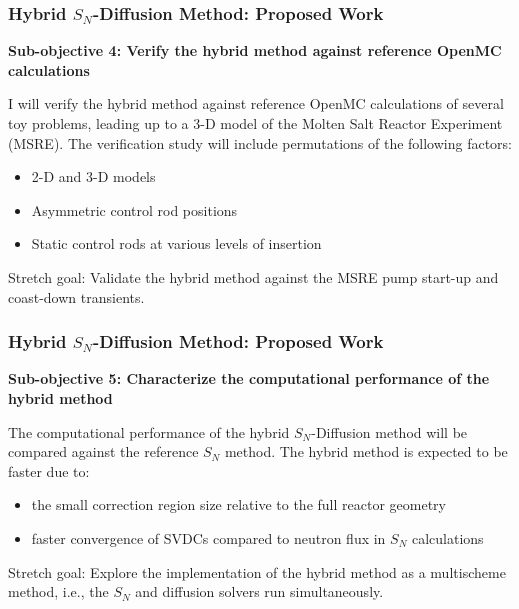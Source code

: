\begin{frame}
  \frametitle{Hybrid $S_N$-Diffusion Method: Proposed Work}
  \textbf{Sub-objective 4: Verify the hybrid method against reference OpenMC calculations}
  \vspace{.3cm}

  I will verify the hybrid method against reference OpenMC calculations of several toy problems,
  leading up to a 3-D model of the Molten Salt Reactor Experiment (MSRE). The verification study
  will include permutations of the following factors:
  \begin{itemize}
    \item 2-D and 3-D models
    \item Asymmetric control rod positions
    \item Static control rods at various levels of insertion
  \end{itemize}
  Stretch goal: Validate the hybrid method against the MSRE pump start-up and coast-down
  transients.
\end{frame}

\begin{frame}
  \frametitle{Hybrid $S_N$-Diffusion Method: Proposed Work}
  \textbf{Sub-objective 5: Characterize the computational performance of the hybrid method}
  \vspace{.3cm}

  The computational performance of the hybrid $S_N$-Diffusion method will be compared against the
  reference $S_N$ method. The hybrid method is expected to be faster due to:
  \begin{itemize}
    \item the small correction region size relative to the full reactor geometry
    \item faster convergence of SVDCs compared to neutron flux in $S_N$ calculations
  \end{itemize}
  Stretch goal: Explore the implementation of the hybrid method as a multischeme method,
  i.e., the $S_N$ and diffusion solvers run simultaneously.
\end{frame}
